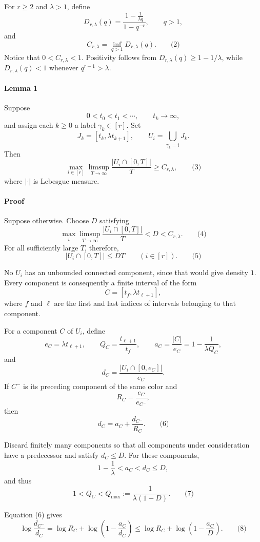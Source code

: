 \documentclass[
  11pt,
  a4paper,
]{article}
\begin{document}
For \(r\ge2\) and \(\lambda>1\), define \[
D_{r,\lambda}(q)
=\frac{1-\frac1{\lambda q}}{1-q^{-r}},
\qquad q>1,
\] and \[
C_{r,\lambda}=\inf_{q>1}D_{r,\lambda}(q).
\qquad\text{(2)}
\] Notice that \(0<C_{r,\lambda}<1\). Positivity follows from
\(D_{r,\lambda}(q)\ge1-1/\lambda\), while \(D_{r,\lambda}(q)<1\)
whenever \(q^{r-1}>\lambda\).

\paragraph{Lemma 1}\label{lemma-1}

Suppose \[
0<t_0<t_1<\cdots,\qquad t_k\longrightarrow\infty,
\] and assign each \(k\ge0\) a label \(\gamma_k\in[r]\). Set \[
J_k=[t_k,\lambda t_{k+1}],
\qquad
U_i=\bigcup_{\gamma_k=i}J_k.
\] Then \[
\max_{i\in[r]}
\limsup_{T\to\infty}\frac{|U_i\cap[0,T]|}{T}
\ge C_{r,\lambda},
\qquad\text{(3)}
\] where \(|\cdot|\) is Lebesgue measure.

\paragraph{Proof}\label{proof}

Suppose otherwise. Choose \(D\) satisfying \[
\max_i\limsup_{T\to\infty}\frac{|U_i\cap[0,T]|}{T}
<D<C_{r,\lambda}.
\qquad\text{(4)}
\] For all sufficiently large \(T\), therefore, \[
|U_i\cap[0,T]|\le DT
\qquad(i\in[r]).
\qquad\text{(5)}
\]

No \(U_i\) has an unbounded connected component, since that would give
density \(1\). Every component is consequently a finite interval of the
form \[
C=[t_f,\lambda t_{\ell+1}],
\] where \(f\) and \(\ell\) are the first and last indices of intervals
belonging to that component.

For a component \(C\) of \(U_i\), define \[
e_C=\lambda t_{\ell+1},\qquad
Q_C=\frac{t_{\ell+1}}{t_f},\qquad
a_C=\frac{|C|}{e_C}=1-\frac1{\lambda Q_C},
\] and \[
d_C=\frac{|U_i\cap[0,e_C]|}{e_C}.
\] If \(C^-\) is its preceding component of the same color and \[
R_C=\frac{e_C}{e_{C^-}},
\] then \[
d_C=a_C+\frac{d_{C^-}}{R_C}.
\qquad\text{(6)}
\]

Discard finitely many components so that all components under
consideration have a predecessor and satisfy \(d_C\le D\). For these
components, \[
1-\frac1\lambda<a_C<d_C\le D,
\] and thus \[
1<Q_C<Q_{\max}:=\frac1{\lambda(1-D)}.
\qquad\text{(7)}
\]

Equation (6) gives \[
\log\frac{d_{C^-}}{d_C}
=\log R_C+\log\left(1-\frac{a_C}{d_C}\right)
\le \log R_C+\log\left(1-\frac{a_C}{D}\right).
\qquad\text{(8)}
\]
\end{document}
